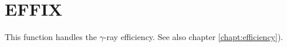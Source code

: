 \section{EFFIX}
\label{sect:effix}

\noindent This function handles the $\gamma$-ray efficiency. See also
chapter \ref{chapt:efficiency}).\\
